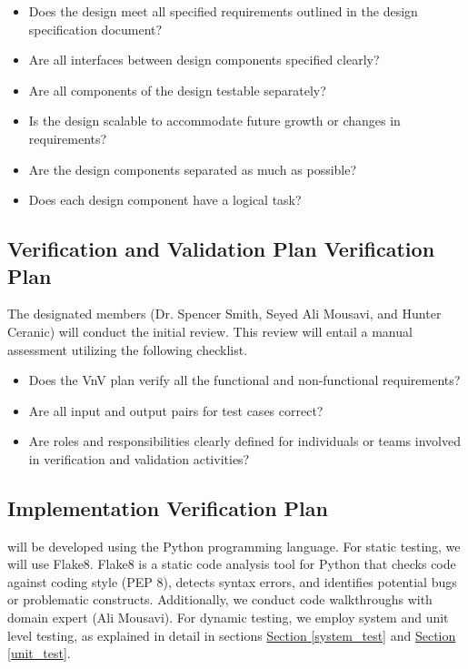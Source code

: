 \documentclass[12pt, titlepage]{article}
\begin{document}
\begin{itemize}\renewcommand{\labelitemi}{\scriptsize$\square$}
  \item Does the design meet all specified requirements outlined in the design specification document?
  \item Are all interfaces between design components specified clearly?
  \item Are all components of the design testable separately?
  \item Is the design scalable to accommodate future growth or changes in requirements?
  \item Are the design components separated as much as possible?
  \item Does each design component have a logical task?
\end{itemize}



\subsection{Verification and Validation Plan Verification Plan}
The designated members (Dr. Spencer Smith, Seyed Ali Mousavi, and Hunter Ceranic) 
will conduct the initial review. This review will entail 
a manual assessment utilizing the following checklist.

\begin{itemize}\renewcommand{\labelitemi}{\scriptsize$\square$}
  \item Does the VnV plan verify all the functional and 
        non-functional requirements?
  \item Are all input and output pairs for test cases correct?
  \item Are roles and responsibilities clearly defined for individuals 
        or teams involved in verification and validation activities?
\end{itemize}




\subsection{Implementation Verification Plan}
\progname{} will be developed using the Python programming language. 
For static testing, we will use Flake8. Flake8 is a static code 
analysis tool for Python that checks code against coding style (PEP 8), 
detects syntax errors, and identifies potential bugs or problematic 
constructs. Additionally, we conduct code 
walkthroughs with domain expert (Ali Mousavi). For dynamic testing, 
we employ system and unit level testing, as explained 
in detail in sections 
\hyperref[system_test]{Section \ref*{system_test}} 
and \hyperref[unit_test]{Section \ref*{unit_test}}.
\end{document}
